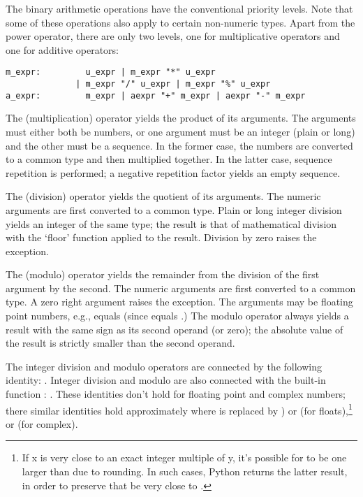 The binary arithmetic operations have the conventional priority
levels.  Note that some of these operations also apply to certain
non-numeric types.  Apart from the power operator, there are only two
levels, one for multiplicative operators and one for additive
operators:

\begin{verbatim}
m_expr:         u_expr | m_expr "*" u_expr
              | m_expr "/" u_expr | m_expr "%" u_expr
a_expr:         m_expr | aexpr "+" m_expr | aexpr "-" m_expr
\end{verbatim}

The \code{*} (multiplication) operator yields the product of its
arguments.  The arguments must either both be numbers, or one argument
must be an integer (plain or long) and the other must be a sequence.
In the former case, the numbers are converted to a common type and
then multiplied together.  In the latter case, sequence repetition is
performed; a negative repetition factor yields an empty sequence.

The \code{/} (division) operator yields the quotient of its
arguments.  The numeric arguments are first converted to a common
type.  Plain or long integer division yields an integer of the same
type; the result is that of mathematical division with the `floor'
function applied to the result.  Division by zero raises the
 exception.

The \code{\%} (modulo) operator yields the remainder from the
division of the first argument by the second.  The numeric arguments
are first converted to a common type.  A zero right argument raises
the  exception.  The arguments may be floating
point numbers, e.g.,  equals  (since
 equals .)  The modulo operator always
yields a result with the same sign as its second operand (or zero);
the absolute value of the result is strictly smaller than the second
operand.

The integer division and modulo operators are connected by the
following identity: .  Integer division and
modulo are also connected with the built-in function :
.  These identities don't hold for
floating point and complex numbers; there similar identities hold
approximately where  is replaced by ) or
 (for floats),\footnote{
    If x is very close to an exact integer multiple of y, it's
    possible for  to be one larger than
     due to rounding.  In such cases, Python returns
    the latter result, in order to preserve that  be very close to .
} or  (for
complex).

